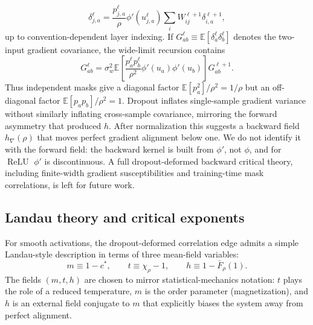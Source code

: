 \documentclass{article}
\DeclareMathOperator{\ReLU}{ReLU}
\newcommand{\relu}{\ensuremath{\ReLU}}
\theoremstyle{plain}
\theoremstyle{definition}
\theoremstyle{remark}
\begin{document}
\relax
\begin{equation}
\delta^\ell_{j,a} = \frac{p^\ell_{j,a}}{\rho} \phi'(u^\ell_{j,a}) \sum_i W^{\ell+1}_{ij}\delta^{\ell+1}_{i,a},
\end{equation}
\relax
up to convention-dependent layer indexing. If \(G^\ell_{ab}\equiv \mathbb E[\delta^\ell_a\delta^\ell_b]\) denotes the two-input gradient covariance, the wide-limit recursion contains
\relax
\begin{equation}
G^\ell_{ab} = \sigma_w^2 \mathbb E\left[ \frac{p^\ell_a p^\ell_b}{\rho^2} \phi'(u_a)\phi'(u_b) \right] G^{\ell+1}_{ab}.
\end{equation}
\relax
Thus independent masks give a diagonal factor \(\mathbb E[p_a^2]/\rho^2=1/\rho\) but an off-diagonal factor \(\mathbb E[p_a p_b]/\rho^2=1\). Dropout inflates single-sample gradient variance without similarly inflating cross-sample covariance, mirroring the forward asymmetry that produced \(h\). After normalization this suggests a backward field \(h_\nabla(\rho)\) that moves perfect gradient alignment below one. We do not identify it with the forward field: the backward kernel is built from \(\phi'\), not \(\phi\), and for \relu{} \(\phi'\) is discontinuous. A full dropout-deformed backward critical theory, including finite-width gradient susceptibilities and training-time mask correlations, is left for future work.










\subsection{Landau theory and critical exponents}

For smooth activations, the dropout-deformed correlation edge admits a simple Landau-style description in terms of
three mean-field variables:
\relax
\begin{equation}
m \equiv 1-c^*, \qquad t \equiv \chi_\rho-1, \qquad h \equiv 1-\bar F_\rho(1).
\end{equation}
\relax
The fields \((m,t,h)\) are chosen to mirror statistical-mechanics notation: \(t\) plays the role of a reduced temperature, \(m\) is the order parameter (magnetization), and \(h\) is an external field conjugate to \(m\) that explicitly biases the system away from perfect alignment.
\end{document}
